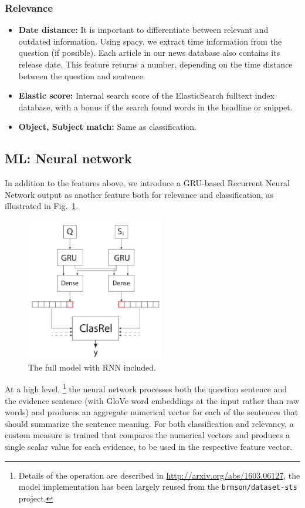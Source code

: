 \documentclass[11pt,a4paper]{article}
\begin{document}
\subsubsection{Relevance}
\begin{itemize}
\item \textbf{Date distance:} It is important to differentiate between relevant and outdated information. Using spacy, we extract time information from the question (if possible). Each article in our news database also contains its release date. This feature returns a number, depending on the time distance between the question and sentence.

\item\textbf{Elastic score:} Internal search score of the ElasticSearch fulltext index database, with a bonus if the search found words in the headline or snippet.

\item\textbf{Object, Subject match:} Same as classification.

\end{itemize}

\subsection{ML: Neural network}
In addition to the features above, we introduce a GRU-based Recurrent Neural Network output as another feature both for relevance and classification,
as illustrated in Fig.~\ref{fig:clasrelfull}.

\begin{figure}[t]
	\centering
	\includegraphics[width=6cm]{clasrelfull}
	\caption{The full model with RNN included.}
	\label{fig:clasrelfull}
\end{figure}

At a high level,%
\footnote{Details of the operation are described in \url{http://arxiv.org/abs/1603.06127},
the model implementation has been largely reused from the \texttt{brmson/dataset-sts} project.}
the neural network processes both the question sentence and the evidence sentence
(with GloVe word embeddings at the input rather than raw words)
and produces an aggregate numerical vector for each of the sentences that should summarize the sentence meaning.
For both classification and relevancy, a custom measure is trained that compares the numerical vectors and produces a single scalar value for each evidence, to be used in the respective feature vector.
\end{document}
